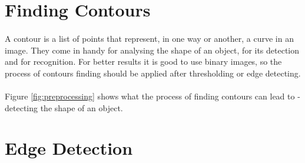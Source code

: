 \section{Finding Contours}
\paragraph{}
A contour is a list of points that represent, in one way or another, a curve in an image.\cite{learning-opencv-3} They come in handy for analysing the shape of an object, for its detection and for recognition. For better results it is good to use binary images, so the process of contours finding should be applied after thresholding or edge detecting.

\paragraph{}
Figure \ref{fig:preprocessing} shows what the process of finding contours can lead to - detecting the shape of an object.

\section{Edge Detection}
